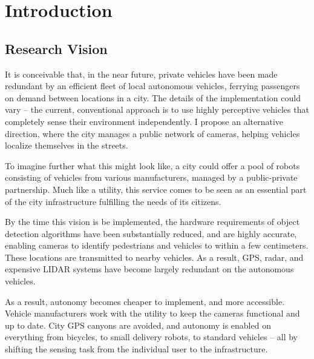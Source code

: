 \documentclass[a4paper,12pt,twoside,openright]{report}
\begin{document}
\pagestyle{empty}
\singlespacing

\onehalfspacing

\singlespacing


\setcounter{page}{0}
\pagestyle{plain}
\tableofcontents
\listoffigures
\listoftables

\onehalfspacing


\chapter{Introduction}
\setcounter{page}{1} 

\section{Research Vision}

It is conceivable that, in the near future, private vehicles have been made redundant by an efficient
fleet of local autonomous vehicles, ferrying passengers on demand between locations in 
a city. The details of the implementation could vary -- the current, conventional
approach is to use highly perceptive vehicles that completely sense their environment independently.
I propose an alternative direction, where the city manages a public network of
cameras, helping vehicles localize themselves in the streets.

To imagine further what this might look like, a city could offer a pool of robots
consisting of vehicles from various manufacturers, managed by a public-private partnership. 
Much like a utility, this service comes to be seen as an essential 
part of the city infrastructure fulfilling the needs of its citizens.

By the time this vision is be implemented, the hardware requirements of
object detection algorithms have been substantially reduced, and are highly accurate, enabling cameras
to identify pedestrians and vehicles to within a few centimeters. These locations are
transmitted to nearby vehicles. As a result, GPS, radar, and expensive LIDAR systems
have become largely redundant on the autonomous vehicles.

As a result, autonomy becomes cheaper to implement,
and more accessible. Vehicle manufacturers work with the utility to keep the cameras 
functional and up to date. City GPS canyons are avoided, and autonomy is enabled 
on everything from bicycles, to small delivery robots, to standard vehicles -- all by 
shifting the sensing task from the individual user to the infrastructure.
\end{document}
